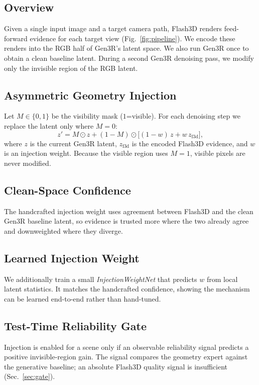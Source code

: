 \documentclass[10pt,twocolumn,letterpaper]{article}
\begin{document}
\subsection{Overview}
Given a single input image and a target camera path, Flash3D renders feed-forward
evidence for each target view (Fig.~\ref{fig:pipeline}). We encode these renders into the RGB half of
Gen3R's latent space. We also run Gen3R once to obtain a clean baseline latent.
During a second Gen3R denoising pass, we modify only the invisible region of the
RGB latent.

\subsection{Asymmetric Geometry Injection}
Let $M\in\{0,1\}$ be the visibility mask ($1$=visible). For each denoising step
we replace the latent only where $M=0$:
\begin{equation}
z' = M \odot z + (1-M)\odot\big[(1-w)\,z + w\,z_{\text{f3d}}\big],
\end{equation}
where $z$ is the current Gen3R latent, $z_{\text{f3d}}$ is the encoded Flash3D
evidence, and $w$ is an injection weight. Because the visible region uses $M=1$,
visible pixels are never modified.

\subsection{Clean-Space Confidence}
The handcrafted injection weight uses agreement between Flash3D and the clean
Gen3R baseline latent, so evidence is trusted more where the two already agree
and downweighted where they diverge.

\subsection{Learned Injection Weight}
We additionally train a small \emph{InjectionWeightNet} that predicts $w$ from
local latent statistics. It matches the handcrafted confidence, showing the
mechanism can be learned end-to-end rather than hand-tuned.

\subsection{Test-Time Reliability Gate}
Injection is enabled for a scene only if an observable reliability signal
predicts a positive invisible-region gain. The signal compares the geometry
expert against the generative baseline; an absolute Flash3D quality signal is
insufficient (Sec.~\ref{sec:gate}).
\end{document}
